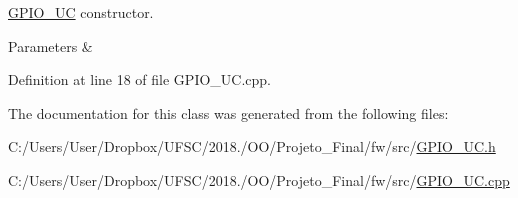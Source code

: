 \mbox{\hyperlink{class_g_p_i_o___u_c}{G\+P\+I\+O\+\_\+\+UC}} constructor. 


\begin{DoxyParams}{Parameters}
{\em } & \\
\hline
\end{DoxyParams}


Definition at line 18 of file G\+P\+I\+O\+\_\+\+U\+C.\+cpp.



The documentation for this class was generated from the following files\+:\begin{DoxyCompactItemize}
\item 
C\+:/\+Users/\+User/\+Dropbox/\+U\+F\+S\+C/2018./\+O\+O/\+Projeto\+\_\+\+Final/fw/src/\mbox{\hyperlink{_g_p_i_o___u_c_8h}{G\+P\+I\+O\+\_\+\+U\+C.\+h}}\item 
C\+:/\+Users/\+User/\+Dropbox/\+U\+F\+S\+C/2018./\+O\+O/\+Projeto\+\_\+\+Final/fw/src/\mbox{\hyperlink{_g_p_i_o___u_c_8cpp}{G\+P\+I\+O\+\_\+\+U\+C.\+cpp}}\end{DoxyCompactItemize}
